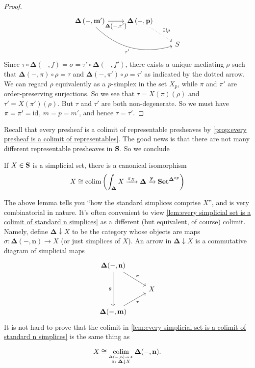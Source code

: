 \begin{proof}
\[\begin{tikzcd}
\mathbf{\Delta}\left(-,\mathbf{m}'\right) \arrow[swap]{r}{\mathbf{\Delta}\left(-,\pi'\right)} \arrow[swap, bend right]{rrd}{\tau'} & \mathbf{\Delta}\left(-,\mathbf{p}\right) \arrow[dotted]{dr}{\exists ! \rho} \\
\; & \; & S
\end{tikzcd} \]
Since $\tau \circ \mathbf{\Delta}(-,f) = \sigma = \tau' \circ\mathbf{\Delta}(-,f')$, there exists a unique mediating $\rho$ such that $\mathbf{\Delta}(-,\pi) \circ \rho = \tau$ and $\mathbf{\Delta}(-,\pi') \circ \rho = \tau'$ as indicated by the dotted arrow. 
We can regard $\rho$ equivalently as a $p$-simplex in the set $X_p$, while $\pi$ and $\pi'$ are order-preserving surjections. So we see that $\tau = X(\pi)(\rho)$ and $\tau' = X(\pi')(\rho)$. But $\tau$ and $\tau'$ are both non-degenerate. So we must have $\pi = \pi' = \operatorname{id}$, $m=p=m'$, and hence $\tau = \tau'$.
\end{proof}

Recall that every presheaf is a colimit of representable presheaves by \cref{prop:every presheaf is a colimit of representables}. The good news is that there are not many different representable presheaves in $\bf{S}$. So we conclude

\begin{lemma}
\label{lem:every simplicial set is a colimit of standard n simplices}
If $X \in \bf{S}$ is a simplicial set, there is a canonical isomorphism
\[ X \cong \operatorname*{colim} \left( \int_{\mathbf{\Delta}} X \xrightarrow{\pi_X} \mathbf{\Delta} \xrightarrow{\mathbf{y}} \mathbf{Set}^{\mathbf{\Delta}^{op}} \right) \]
\end{lemma}
The above lemma tells you ``how the standard simplices comprise $X$'', and is very combinatorial in nature. It's often convenient to view \cref{lem:every simplicial set is a colimit of standard n simplices} as a different (but equivalent, of course) colimit. Namely, define $\mathbf{\Delta}  \downarrow  X$ to be the category whose objects are maps $\sigma : \mathbf{\Delta}(-,\mathbf{n}) \to X$ (or just simplices of $X$). An arrow in $\mathbf{\Delta}  \downarrow  X$ is a commutative diagram of simplicial maps
\[ \begin{tikzcd}
\mathbf{\Delta}(-,\mathbf{n}) \arrow[swap]{dd}{\theta} \arrow{dr}{\sigma} & \; \\
 & X \\
\mathbf{\Delta}(-,\mathbf{m}) \arrow[swap]{ur}{\tau} & \;
\end{tikzcd} \]
It is not hard to prove that the colimit in \cref{lem:every simplicial set is a colimit of standard n simplices} is the same thing as
\begin{lemma}
\[ X \cong \operatorname*{colim}_{\stackrel{\mathbf{\Delta}(-,\mathbf{n}) \to X}{\text{in } \mathbf{\Delta}\downarrow X}} \mathbf{\Delta}(-,\mathbf{n}). \]
\end{lemma}

